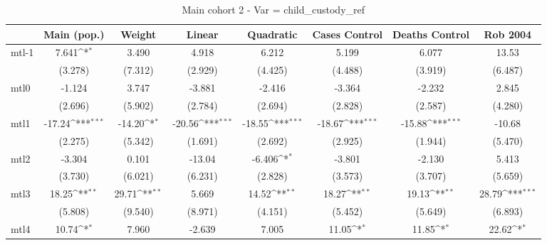 \documentclass{article}
\begin{document}
{
\def\sym#1{\ifmmode^{#1}\else\(^{#1}\)\fi}
\begin{longtable}{l*{7}{c}}
\caption{Main cohort 2 - Var = child\_custody\_ref}\\
\hline\hline\endfirsthead\hline\endhead\hline\endfoot\endlastfoot
                &\multicolumn{1}{c}{Main (pop.)}&\multicolumn{1}{c}{Weight}&\multicolumn{1}{c}{Linear}&\multicolumn{1}{c}{Quadratic}&\multicolumn{1}{c}{Cases Control}&\multicolumn{1}{c}{Deaths Control}&\multicolumn{1}{c}{Rob 2004}\\
\hline
mtl-1           &    7.641\sym{*}  &    3.490         &    4.918         &    6.212         &    5.199         &    6.077         &    13.53         \\
                &  (3.278)         &  (7.312)         &  (2.929)         &  (4.425)         &  (4.488)         &  (3.919)         &  (6.487)         \\
mtl0            &   -1.124         &    3.747         &   -3.881         &   -2.416         &   -3.364         &   -2.232         &    2.845         \\
                &  (2.696)         &  (5.902)         &  (2.784)         &  (2.694)         &  (2.828)         &  (2.587)         &  (4.280)         \\
mtl1            &   -17.24\sym{***}&   -14.20\sym{*}  &   -20.56\sym{***}&   -18.55\sym{***}&   -18.67\sym{***}&   -15.88\sym{***}&   -10.68         \\
                &  (2.275)         &  (5.342)         &  (1.691)         &  (2.692)         &  (2.925)         &  (1.944)         &  (5.470)         \\
mtl2            &   -3.304         &    0.101         &   -13.04         &   -6.406\sym{*}  &   -3.801         &   -2.130         &    5.413         \\
                &  (3.730)         &  (6.021)         &  (6.231)         &  (2.828)         &  (3.573)         &  (3.707)         &  (5.659)         \\
mtl3            &    18.25\sym{**} &    29.71\sym{**} &    5.669         &    14.52\sym{**} &    18.27\sym{**} &    19.13\sym{**} &    28.79\sym{***}\\
                &  (5.808)         &  (9.540)         &  (8.971)         &  (4.151)         &  (5.452)         &  (5.649)         &  (6.893)         \\
mtl4            &    10.74\sym{*}  &    7.960         &   -2.639         &    7.005         &    11.05\sym{*}  &    11.85\sym{*}  &    22.62\sym{*}  \\

\end{longtable}}
\end{document}
